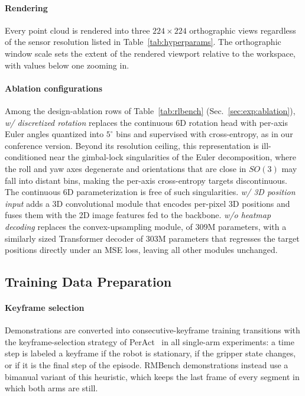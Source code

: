 \paragraph{Rendering}
Every point cloud is rendered into three $224 \times 224$ orthographic
views regardless of the sensor resolution listed in
Table~\ref{tab:hyperparams}.
The orthographic window scale sets the extent of the rendered viewport
relative to the workspace, with values below one zooming in.

\paragraph{Ablation configurations}
Among the design-ablation rows of Table~\ref{tab:rlbench}
(Sec.~\ref{sec:exp:ablation}), \emph{w/ discretized rotation} replaces
the continuous 6D rotation head with per-axis Euler angles quantized
into $5^{\circ}$ bins and supervised with cross-entropy, as in our
conference version.
Beyond its resolution ceiling, this representation is ill-conditioned
near the gimbal-lock singularities of the Euler decomposition, where
the roll and yaw axes degenerate and orientations that are close in
$SO(3)$ may fall into distant bins, making the per-axis cross-entropy
targets discontinuous.
The continuous 6D parameterization is free of such singularities.
\emph{w/ 3D position input} adds a 3D convolutional module that encodes
per-pixel 3D positions and fuses them with the 2D image features fed to
the backbone.
\emph{w/o heatmap decoding} replaces the convex-upsampling module, of
309M parameters, with a similarly sized Transformer decoder of 303M
parameters that regresses the target positions directly under an MSE
loss, leaving all other modules unchanged.

\subsection{Training Data Preparation}
\label{app:keyframe_selection}

\paragraph{Keyframe selection}
Demonstrations are converted into consecutive-keyframe training
transitions with the keyframe-selection strategy of
PerAct~\cite{shridhar2023perceiver} in all single-arm experiments: a
time step is labeled a keyframe if the robot is stationary, if the
gripper state changes, or if it is the final step of the episode.
RMBench demonstrations instead use a bimanual variant of this
heuristic, which keeps the last frame of every segment in which both
arms are still.

